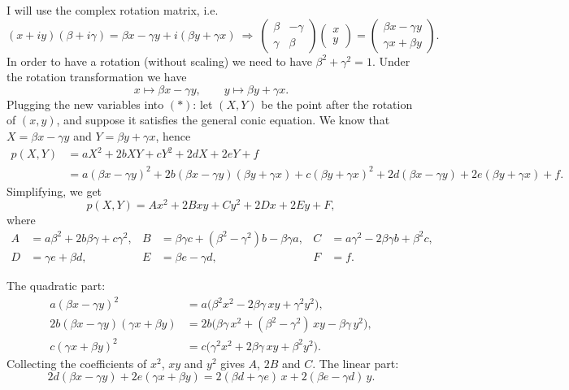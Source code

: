 I will use the complex rotation matrix, i.e.
\[
(x+iy)(\beta + i\gamma) = \beta x - \gamma y + i(\beta y + \gamma x)
\ \Rightarrow\
\begin{pmatrix} \beta & -\gamma \\ \gamma & \beta \end{pmatrix}
\begin{pmatrix} x \\ y \end{pmatrix}
= \begin{pmatrix} \beta x - \gamma y \\ \gamma x + \beta y \end{pmatrix}.
\]
In order to have a rotation (without scaling) we need to have $\beta^2 + \gamma^2 = 1$. Under the rotation transformation we have
\[
x \mapsto \beta x - \gamma y, \qquad y \mapsto \beta y + \gamma x .
\]
Plugging the new variables into $(*)$: let $(X,Y)$ be the point after the rotation of $(x,y)$, and suppose it satisfies the general conic equation. We know that $X = \beta x - \gamma y$ and $Y = \beta y + \gamma x$, hence
\[
\begin{aligned}
p(X,Y) &= aX^2 + 2bXY + cY^2 + 2dX + 2eY + f \\
&= a(\beta x - \gamma y)^2 + 2b(\beta x - \gamma y)(\beta y + \gamma x) + c(\beta y + \gamma x)^2 + 2d(\beta x - \gamma y) + 2e(\beta y + \gamma x) + f .
\end{aligned}
\]
Simplifying, we get
\[
p(X,Y) = Ax^2 + 2Bxy + Cy^2 + 2Dx + 2Ey + F,
\]
where
\[
\begin{aligned}
A &= a\beta^2 + 2b\beta\gamma + c\gamma^2, &
B &= \beta\gamma c + (\beta^2 - \gamma^2)b - \beta\gamma a, &
C &= a\gamma^2 - 2\beta\gamma b + \beta^2 c, \\
D &= \gamma e + \beta d, &
E &= \beta e - \gamma d, &
F &= f .
\end{aligned}
\]

\begin{calc}
The quadratic part:
\[
\begin{aligned}
a(\beta x - \gamma y)^2 &= a\big(\beta^2 x^2 - 2\beta\gamma\, xy + \gamma^2 y^2\big),\\
2b(\beta x - \gamma y)(\gamma x + \beta y) &= 2b\big(\beta\gamma\, x^2 + (\beta^2 - \gamma^2)\, xy - \beta\gamma\, y^2\big),\\
c(\gamma x + \beta y)^2 &= c\big(\gamma^2 x^2 + 2\beta\gamma\, xy + \beta^2 y^2\big).
\end{aligned}
\]
Collecting the coefficients of $x^2$, $xy$ and $y^2$ gives $A$, $2B$ and $C$. The linear part:
\[
2d(\beta x - \gamma y) + 2e(\gamma x + \beta y) = 2(\beta d + \gamma e)\,x + 2(\beta e - \gamma d)\,y .
\]
\end{calc}

